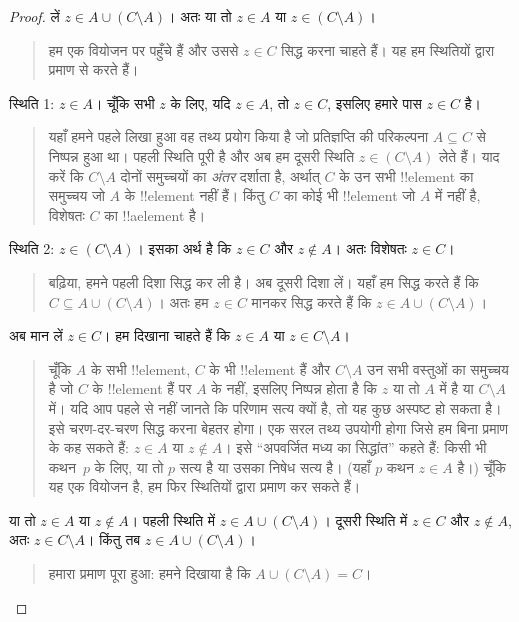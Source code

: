 \documentclass[../../../include/open-logic-section]{subfiles}
\begin{document}
\begin{proof}
  लें $z \in A \cup (C \setminus A)$। अतः या तो $z \in A$ या $z \in
  (C \setminus A)$।
  \begin{quote}
    हम एक वियोजन पर पहुँचे हैं और उससे $z \in C$ सिद्ध करना चाहते हैं। यह
    हम स्थितियों द्वारा प्रमाण से करते हैं।
  \end{quote}
  स्थिति 1: $z \in A$। चूँकि सभी $z$ के लिए, यदि $z \in A$, तो $z \in
  C$, इसलिए हमारे पास $z \in C$ है।
  \begin{quote}
    यहाँ हमने पहले लिखा हुआ वह तथ्य प्रयोग किया है जो प्रतिज्ञप्ति की
    परिकल्पना $A \subseteq C$ से निष्पन्न हुआ था। पहली स्थिति पूरी है और
    अब हम दूसरी स्थिति $z \in (C \setminus A)$ लेते हैं। याद करें कि $C
    \setminus A$ दोनों समुच्चयों का \emph{अंतर} दर्शाता है, अर्थात् $C$ के
    उन सभी !!{element} का समुच्चय जो $A$ के !!{element} नहीं हैं। किंतु
    $C$ का कोई भी !!{element} जो $A$ में नहीं है, विशेषतः $C$ का
    !!a{element} है।
  \end{quote}
  स्थिति 2: $z \in (C \setminus A)$। इसका अर्थ है कि $z \in C$ और $z
  \notin A$। अतः विशेषतः $z \in C$।
  \begin{quote}
    बढ़िया, हमने पहली दिशा सिद्ध कर ली है। अब दूसरी दिशा लें। यहाँ हम सिद्ध
    करते हैं कि $C \subseteq A \cup (C \setminus A)$। अतः हम $z \in C$
    मानकर सिद्ध करते हैं कि $z \in A \cup (C \setminus A)$।
  \end{quote}
  अब मान लें $z \in C$। हम दिखाना चाहते हैं कि $z \in A$ या $z \in C
  \setminus A$।
  \begin{quote}
    चूँकि $A$ के सभी !!{element}, $C$ के भी !!{element} हैं और $C
    \setminus A$ उन सभी वस्तुओं का समुच्चय है जो $C$ के !!{element} हैं
    पर $A$ के नहीं, इसलिए निष्पन्न होता है कि $z$ या तो $A$ में है या $C
    \setminus A$ में। यदि आप पहले से नहीं जानते कि परिणाम सत्य क्यों है, तो
    यह कुछ अस्पष्ट हो सकता है। इसे चरण-दर-चरण सिद्ध करना बेहतर होगा। एक सरल
    तथ्य उपयोगी होगा जिसे हम बिना प्रमाण के कह सकते हैं: $z \in A$ या $z
    \notin A$। इसे ``अपवर्जित मध्य का सिद्धांत'' कहते हैं: किसी भी कथन~$p$
    के लिए, या तो $p$ सत्य है या उसका निषेध सत्य है। (यहाँ $p$ कथन $z \in
    A$ है।) चूँकि यह एक वियोजन है, हम फिर स्थितियों द्वारा प्रमाण कर सकते
    हैं।
  \end{quote}
  या तो $z \in A$ या $z \notin A$। पहली स्थिति में $z \in A \cup (C
  \setminus A)$। दूसरी स्थिति में $z \in C$ और $z \notin A$, अतः $z
  \in C \setminus A$। किंतु तब $z \in A \cup (C \setminus A)$।
  \begin{quote}
    हमारा प्रमाण पूरा हुआ: हमने दिखाया है कि $A \cup (C \setminus A) = C$।
  \end{quote}
\end{proof}
\end{document}
